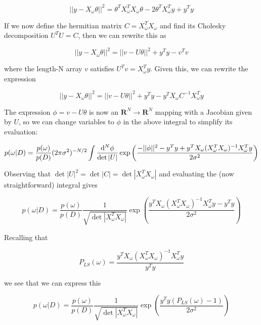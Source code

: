 \documentclass[12pt,pdftex]{article}
\begin{document}
\begin{equation}
  ||y - X_\omega\theta||^2 = \theta^TX_\omega^TX_\omega\theta - 2\theta^TX_\omega^Ty + y^Ty
\end{equation}

If we now define the hermitian matrix $C = X_\omega^TX_\omega$ and find its Cholesky decomposition $U^TU = C$, then we can rewrite this as

\begin{equation}
  ||y - X_\omega\theta||^2 = ||v - U\theta||^2 + y^Ty - v^Tv
\end{equation}

where the length-N array $v$ satisfies $U^Tv = X_\omega^Ty$. Given this, we can rewrite the expression

\begin{equation}
  ||y - X_\omega\theta||^2 = ||v - U\theta||^2 + y^Ty - y^TX_\omega C^{-1}X_\omega^Ty
\end{equation}

The expression $\phi = v - U\theta$ is now an $\mathbf{R}^N\to\mathbf{R}^N$ mapping with a Jacobian given by $U$, so we can change variables to $\phi$ in the above integral to simplify its evaluation:

\begin{equation}
  p(\omega|D) = \frac{p(\omega)}{p(D)}(2\pi\sigma^2)^{-N/2}
\int\frac{{\rm d}^N\phi}{\det|U|}\exp\left(\frac{-||\phi||^2 - y^Ty + y^TX_\omega(X_\omega^TX_\omega)^{-1}X_\omega^Ty}{2\sigma^2}\right)
\end{equation}

Observing that $\det|U|^2 = \det|C| = \det|X_\omega^TX_\omega|$ and evaluating the (now straightforward) integral gives

\begin{equation}
  p(\omega|D) = \frac{p(\omega)}{p(D)}\frac{1}{\sqrt{\det|X_\omega^TX_\omega|}}
  \exp\left(\frac{y^TX_\omega(X_\omega^TX_\omega)^{-1}X_\omega^Ty - y^Ty}{2\sigma^2}\right)
\end{equation}

Recalling that

\begin{equation}
  P_{LS}(\omega) = \frac{y^TX_\omega(X_\omega^TX_\omega)^{-1}X_\omega^Ty}{y^Ty}
\end{equation}

we see that we can express this

\begin{equation}
  p(\omega|D) = \frac{p(\omega)}{p(D)}\frac{1}{\sqrt{\det|X_\omega^TX_\omega|}}
  \exp\left(\frac{y^Ty(P_{LS}(\omega) - 1)}{2\sigma^2}\right)
\end{equation}
\end{document}
